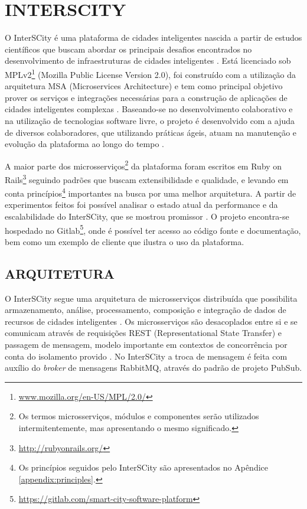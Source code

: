 \chapter[INTERSCITY]{INTERSCITY}
\label{chapter:interscity}

O InterSCity é uma plataforma de cidades inteligentes nascida a partir de
estudos científicos que buscam abordar os principais desafios encontrados
no desenvolvimento de infraestruturas de cidades inteligentes \cite{nof2016}.
Está licenciado sob
MPLv2\footnote{\url{www.mozilla.org/en-US/MPL/2.0/}} (Mozilla Public License
Version 2.0), foi construído com a
utilização da arquitetura MSA (Microservices Architecture) e tem como principal
objetivo prover os serviços e integrações necessárias para a construção de
aplicações de cidades inteligentes complexas \cite{delesposte2017}. Baseando-se
no desenvolvimento colaborativo e na utilização de tecnologias software livre,
o projeto é desenvolvido com a ajuda de diversos colaboradores, que utilizando
práticas ágeis, atuam na manutenção e evolução da plataforma ao longo do tempo
\cite{delesposte2017}.

A maior parte dos microsserviços\footnote{Os termos microsserviços, módulos e
componentes serão utilizados intermitentemente, mas apresentando o mesmo
significado.} da plataforma foram escritos em Ruby on Rails\footnote{\url{http://rubyonrails.org/}}
seguindo padrões que buscam extensibilidade e qualidade, e levando em conta
princípios\footnote{Os princípios seguidos pelo InterSCity são apresentados no
Apêndice \ref{appendix:principles}.} importantes na busca por uma melhor arquitetura.
A partir de experimentos feitos foi possível analisar
o estado atual da performance e da escalabilidade do InterSCity, que se mostrou
promissor \cite{delesposte2017}. O projeto encontra-se hospedado no
Gitlab\footnote{\url{https://gitlab.com/smart-city-software-platform}},
onde é possível ter acesso ao código fonte e documentação, bem como um exemplo de
cliente que ilustra o uso da plataforma.

\section{ARQUITETURA}
\label{sec:architecture}

O InterSCity segue uma arquitetura de microsserviços distribuída que
possibilita armazenamento, análise, processamento, composição e integração de
dados de recursos de cidades inteligentes \cite{delesposte2017}. Os
microsserviços são desacoplados entre si e se comunicam através de requisições REST
(Representational State Transfer) e passagem de mensagem, modelo importante em
contextos de concorrência por conta do isolamento provido \cite{armstrong2003}.
No InterSCity a troca de mensagem é feita com auxílio do \textit{broker} de
mensagens RabbitMQ, através do padrão de projeto PubSub.

